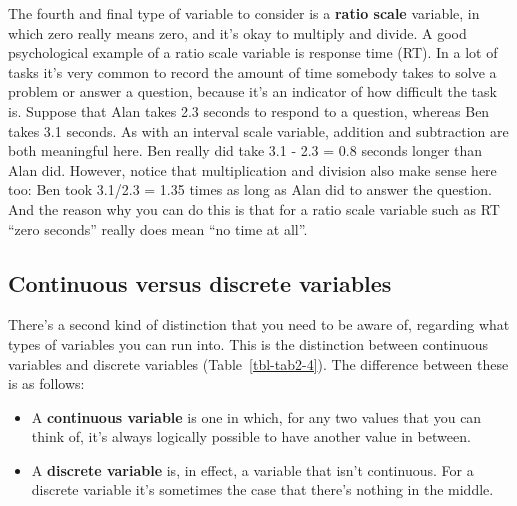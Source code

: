 \documentclass[
  letterpaper,
]{book}
\providecommand{\tightlist}{%
  \setlength{\itemsep}{0pt}\setlength{\parskip}{0pt}}\usepackage{longtable,booktabs,array}
\begin{document}
The fourth and final type of variable to consider is a \textbf{ratio
scale} variable, in which zero really means zero, and it's okay to
multiply and divide. A good psychological example of a ratio scale
variable is response time (RT). In a lot of tasks it's very common to
record the amount of time somebody takes to solve a problem or answer a
question, because it's an indicator of how difficult the task is.
Suppose that Alan takes 2.3 seconds to respond to a question, whereas
Ben takes 3.1 seconds. As with an interval scale variable, addition and
subtraction are both meaningful here. Ben really did take 3.1 - 2.3 =
0.8 seconds longer than Alan did. However, notice that multiplication
and division also make sense here too: Ben took 3.1/2.3 = 1.35 times as
long as Alan did to answer the question. And the reason why you can do
this is that for a ratio scale variable such as RT ``zero seconds''
really does mean ``no time at all''.

\hypertarget{continuous-versus-discrete-variables}{%
\subsection{Continuous versus discrete
variables}\label{continuous-versus-discrete-variables}}

There's a second kind of distinction that you need to be aware of,
regarding what types of variables you can run into. This is the
distinction between continuous variables and discrete variables
(Table~\ref{tbl-tab2-4}). The difference between these is as follows:

\begin{itemize}
\tightlist
\item
  A \textbf{continuous variable} is one in which, for any two values
  that you can think of, it's always logically possible to have another
  value in between.
\item
  A \textbf{discrete variable} is, in effect, a variable that isn't
  continuous. For a discrete variable it's sometimes the case that
  there's nothing in the middle.
\end{itemize}

\hypertarget{tbl-tab2-4}{}
 
  \providecommand{\huxb}[2]{\arrayrulecolor[RGB]{#1}\global\arrayrulewidth=#2pt}
  \providecommand{\huxvb}[2]{\color[RGB]{#1}\vrule width #2pt}
  \providecommand{\huxtpad}[1]{\rule{0pt}{#1}}
  \providecommand{\huxbpad}[1]{\rule[-#1]{0pt}{#1}}
\end{document}
